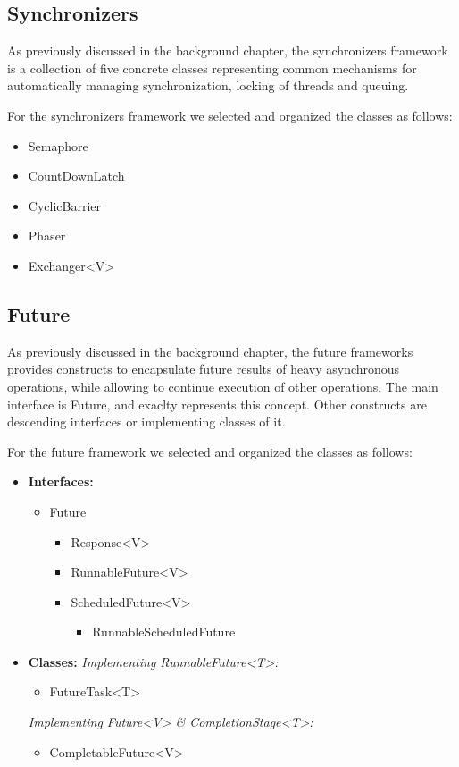 \documentclass[]{usiinfthesis}
\begin{document}
\subsection{Synchronizers}
As previously discussed in the background chapter, the synchronizers framework is a collection of five concrete classes representing common mechanisms for automatically managing synchronization, locking of threads and queuing.

\noindent
For the synchronizers framework we selected and organized the classes as follows:

\begin{itemize}
    \item Semaphore
    \item CountDownLatch
    \item CyclicBarrier
    \item Phaser
    \item Exchanger<V>
\end{itemize}

\subsection{Future}
As previously discussed in the background chapter, the future frameworks provides constructs to encapsulate future results of heavy asynchronous operations, while allowing to continue execution of other operations. The main interface is Future, and exaclty represents this concept. Other constructs are descending interfaces or implementing classes of it.

\noindent
For the future framework we selected and organized the classes as follows:

\begin{itemize}
    \item \textbf{Interfaces:}
    \begin{itemize}
        \item Future
        \begin{itemize}
            \item Response<V>
            \item RunnableFuture<V>
            \item ScheduledFuture<V>
            \begin{itemize}
                \item RunnableScheduledFuture
            \end{itemize}
        \end{itemize}
    \end{itemize}
    \item \textbf{Classes:}
    \newline
    \textit{Implementing RunnableFuture<T>:}
    \begin{itemize}
        \item FutureTask<T>
    \end{itemize}
    \textit{Implementing Future<V> \& CompletionStage<T>:}
    \begin{itemize}
        \item CompletableFuture<V>
    \end{itemize}
\end{itemize}
\end{document}
